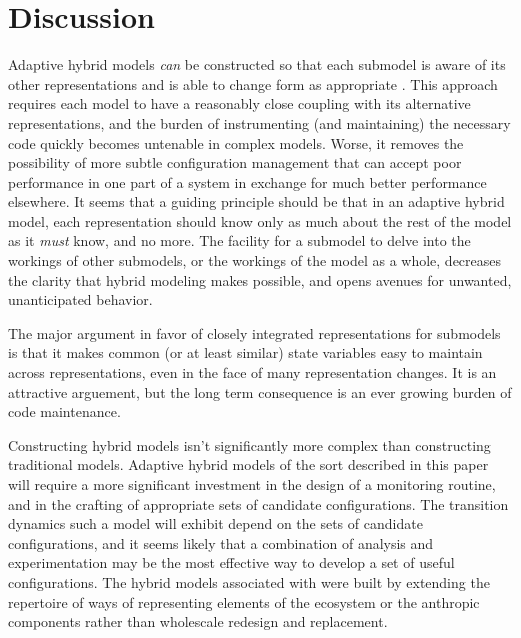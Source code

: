 \section{Discussion}

Adaptive hybrid models \emph{can} be constructed so that each
submodel is aware of its other rep\-re\-sen\-ta\-tions and is able to change
form as appropriate \citep{Gray2012adaptive}. This approach requires each
model to have a reasonably close coupling with its alternative
rep\-re\-sen\-ta\-tions, and the burden of instrumenting (and maintaining) the
necessary code quickly becomes untenable in complex models.  Worse, it
removes the possibility of more subtle con\-fig\-ur\-a\-tion management that
can accept poor performance in one part of a system in exchange for
much better performance elsewhere.  It seems that a guiding principle
should be that in an adaptive hybrid model, each rep\-re\-sen\-ta\-tion should
know only as much about the rest of the model as it \emph{must} know,
and no more. The facility for a sub\-model to delve into the workings of
other sub\-models, or the workings of the model as a whole, decreases
the clarity that hybrid modeling makes possible, and opens avenues
for unwanted, unanticipated behavior.

The major argument in favor of closely integrated rep\-re\-sen\-ta\-tions for
sub\-models is that it makes common (or at least similar) state
variables easy to maintain across rep\-re\-sen\-ta\-tions, even in the face of
many rep\-re\-sen\-ta\-tion changes. It is an attractive arguement, but the
long term consequence is an ever growing burden of code maintenance.

Constructing hybrid models isn't significantly more complex than
constructing traditional models. Adaptive hybrid models of the sort
described in this paper will require a more significant investment in
the design of a monitoring routine, and in the crafting of appropriate
sets of candidate con\-fig\-ur\-a\-tions.  The transition dynamics such a
model will exhibit depend on the sets of candidate con\-fig\-ur\-a\-tions, and
it seems likely that a combination of analysis and experimentation may
be the most effective way to develop a set of useful con\-fig\-ur\-a\-tions.
The hybrid models associated with \cite{Lyne1994pmez5, Little2006nws,
  Fulton2009crossingscales} were built by extending the repertoire of ways of
representing elements of the ecosystem or the anthropic components
rather than wholescale redesign and replacement.

